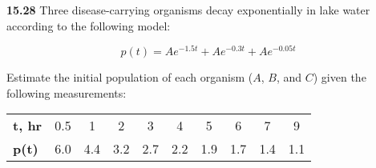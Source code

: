 \documentclass[../main.tex]{subfiles}
\begin{document}
\begin{multicols}{2}
	\noindent\textbf{15.28} Three disease-carrying organisms decay exponentially in lake water according to the following model:

	$$
		p(t) = Ae^{-1.5t} + Ae^{-0.3t} + Ae^{-0.05t}
	$$

	\noindent  Estimate the initial population of each organism ($A$, $B$,
	and $C$) given the following measurements:

	\noindent
	\begin{tabular}{l c c c c c c c c c}
		\textbf{t, hr} & 0.5 & 1 & 2 & 3 & 4 & 5 & 6 & 7 & 9 \\
		\textbf{p(t)} & 6.0 & 4.4 & 3.2 & 2.7 & 2.2 & 1.9 & 1.7 & 1.4 & 1.1
	\end{tabular}
\end{multicols}
\end{document}

